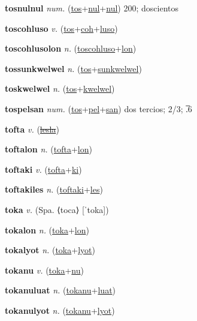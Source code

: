 \textbf{\hypertarget{tosnulnul}{tosnulnul}} \textit{num.} (\hyperlink{tos}{tos}+\allowbreak \hyperlink{nul}{nul}+\allowbreak \hyperlink{nul}{nul})
200; doscientos

\textbf{\hypertarget{toscohluso}{toscohluso}} \textit{v.} (\hyperlink{tos}{tos}+\allowbreak \hyperlink{coh}{coh}+\allowbreak \hyperlink{luso}{luso})


\textbf{\hypertarget{toscohlusolon}{toscohlusolon}} \textit{n.} (\hyperlink{toscohluso}{toscohluso}+\allowbreak \hyperlink{lon}{lon})


\textbf{\hypertarget{tossunkwelwel}{tossunkwelwel}} \textit{n.} (\hyperlink{tos}{tos}+\allowbreak \hyperlink{sunkwelwel}{sunkwelwel})


\textbf{\hypertarget{toskwelwel}{toskwelwel}} \textit{n.} (\hyperlink{tos}{tos}+\allowbreak \hyperlink{kwelwel}{kwelwel})


\textbf{\hypertarget{tospelsan}{tospelsan}} \textit{num.} (\hyperlink{tos}{tos}+\allowbreak \hyperlink{pel}{pel}+\allowbreak \hyperlink{san}{san})
dos tercios; 2/3; .̅6

\textbf{\hypertarget{tofta}{tofta}} \textit{v.} (\hyperlink{lesla}{\sout{lesla}})


\textbf{\hypertarget{toftalon}{toftalon}} \textit{n.} (\hyperlink{tofta}{tofta}+\allowbreak \hyperlink{lon}{lon})


\textbf{\hypertarget{toftaki}{toftaki}} \textit{v.} (\hyperlink{tofta}{tofta}+\allowbreak \hyperlink{ki}{ki})


\textbf{\hypertarget{toftakiles}{toftakiles}} \textit{n.} (\hyperlink{toftaki}{toftaki}+\allowbreak \hyperlink{les}{les})


\textbf{\hypertarget{toka}{toka}} \textit{v.} (Spa. ⟨toca⟩ [ˈtoka])


\textbf{\hypertarget{tokalon}{tokalon}} \textit{n.} (\hyperlink{toka}{toka}+\allowbreak \hyperlink{lon}{lon})


\textbf{\hypertarget{tokalyot}{tokalyot}} \textit{n.} (\hyperlink{toka}{toka}+\allowbreak \hyperlink{lyot}{lyot})


\textbf{\hypertarget{tokanu}{tokanu}} \textit{v.} (\hyperlink{toka}{toka}+\allowbreak \hyperlink{nu}{nu})


\textbf{\hypertarget{tokanuluat}{tokanuluat}} \textit{n.} (\hyperlink{tokanu}{tokanu}+\allowbreak \hyperlink{luat}{luat})


\textbf{\hypertarget{tokanulyot}{tokanulyot}} \textit{n.} (\hyperlink{tokanu}{tokanu}+\allowbreak \hyperlink{lyot}{lyot})


